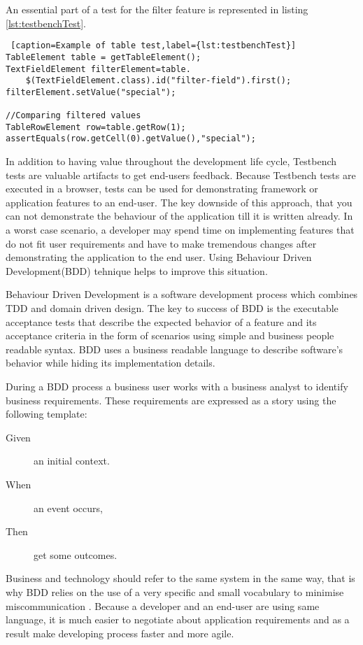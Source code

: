 An essential  part of a test for the filter feature is represented in listing
\ref{lst:testbenchTest}. 

 \lstset{style=a1listing}
  \begin{lstlisting} [caption=Example of table test,label={lst:testbenchTest}]
TableElement table = getTableElement();
TextFieldElement filterElement=table.
	$(TextFieldElement.class).id("filter-field").first();
filterElement.setValue("special");

//Comparing filtered values
TableRowElement row=table.getRow(1);
assertEquals(row.getCell(0).getValue(),"special");
  \end{lstlisting}

In addition to having value throughout the development life cycle,
Testbench tests are valuable artifacts to get end-users feedback.
Because Testbench tests are executed in a browser, tests can be used 
for demonstrating framework or application features to an end-user. The key
downside of this approach, that you can not demonstrate the behaviour of the
application till it is written already. In a worst case scenario, a developer
may spend time on implementing features that do not fit user requirements and
have to make tremendous changes after demonstrating the application to the end
user. Using Behaviour Driven Development(BDD) tehnique helps to improve this
situation.

Behaviour Driven Development is a software development process which combines
TDD and domain driven design. The key to success of BDD is the executable
acceptance tests that describe the expected behavior of a feature and its
acceptance criteria in the form of scenarios using simple and
business people readable syntax\cite{bddArticle}. BDD uses a business readable
language to describe software's behavior while hiding its implementation
details.

During a BDD process a business user works with a business analyst
to identify business requirements. These requirements are expressed as a story
using the following template:

\begin{description}
  \item[Given] an initial context.
  \item[When] an event occurs,
  \item[Then] get some outcomes. 
\end{description}

Business and technology should refer to the same system in the same way, that is
why BDD relies on the use of a very specific and small vocabulary to minimise miscommunication \cite{bddWebSite}.
Because a developer and an end-user are using same language, it is much easier
to negotiate about application requirements and as a result make developing
process faster and more agile.

